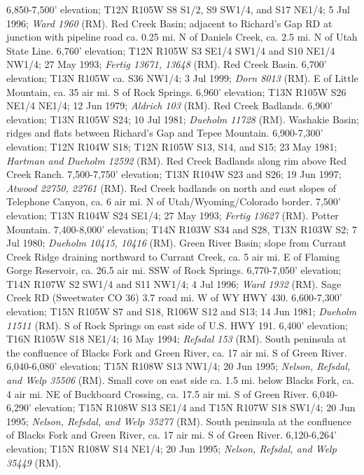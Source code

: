 6,850-7,500' elevation; T12N R105W S8 S1/2, S9 SW1/4, and S17 NE1/4; 5 Jul 1996;
\textit{Ward 1960} (RM).
Red Creek Basin; adjacent to Richard's Gap RD at junction with pipeline road ca.
0.25 mi. N of Daniels Creek, ca. 2.5 mi. N of Utah State Line. 6,760' elevation;
T12N R105W S3 SE1/4 SW1/4 and S10 NE1/4 NW1/4; 27 May 1993;
\textit{Fertig 13671, 13648} (RM).
Red Creek Basin. 6,700' elevation; T13N R105W ca. S36 NW1/4; 3 Jul 1999;
\textit{Dorn 8013} (RM).
E of Little Mountain, ca. 35 air mi. S of Rock Springs. 6,960' elevation;
T13N R105W S26 NE1/4 NE1/4; 12 Jun 1979; \textit{Aldrich 103} (RM).
Red Creek Badlands. 6,900' elevation; T13N R105W S24; 10 Jul 1981;
\textit{Dueholm 11728} (RM).
Washakie Basin; ridges and flats between Richard's Gap and Tepee Mountain.
6,900-7,300' elevation; T12N R104W S18; T12N R105W S13, S14, and S15;
23 May 1981; \textit{Hartman and Dueholm 12592} (RM).
Red Creek Badlands along rim above Red Creek Ranch.	7,500-7,750' elevation;
T13N R104W S23 and S26; 19 Jun 1997; \textit{Atwood 22750, 22761} (RM).
Red Creek badlands on north and east slopes of Telephone Canyon, ca. 6 air mi.
N of Utah/Wyoming/Colorado border. 7,500' elevation; T13N R104W S24 SE1/4;
27 May 1993; \textit{Fertig 13627} (RM).
Potter Mountain. 7,400-8,000' elevation; T14N R103W S34 and S28,
T13N R103W S2; 7 Jul 1980; \textit{Dueholm 10415, 10416} (RM).
Green River Basin; slope from Currant Creek Ridge draining northward to Currant
Creek, ca. 5 air mi. E of Flaming Gorge Reservoir, ca. 26.5 air mi. SSW of Rock
Springs. 6,770-7,050' elevation; T14N R107W S2 SW1/4 and S11 NW1/4; 4 Jul 1996;
\textit{Ward 1932} (RM).
Sage Creek RD (Sweetwater CO 36) 3.7 road mi. W of WY HWY 430.
6,600-7,300' elevation; T15N R105W S7 and S18, R106W S12 and S13; 14 Jun 1981;
\textit{Dueholm 11511} (RM).
S of Rock Springs on east side of U.S. HWY 191. 6,400' elevation;
T16N R105W S18 NE1/4; 16 May 1994; \textit{Refsdal 153} (RM).
South peninsula at the confluence of Blacks Fork and Green River, ca. 17 air mi.
S of Green River. 6,040-6,080' elevation; T15N R108W S13 NW1/4; 20 Jun 1995;
\textit{Nelson, Refsdal, and Welp 35506} (RM).
Small cove on east side ca. 1.5 mi. below Blacks Fork, ca. 4 air mi. NE of
Buckboard Crossing, ca. 17.5 air mi. S of Green River. 6,040-6,290' elevation;
T15N R108W S13 SE1/4 and T15N R107W S18 SW1/4; 20 Jun 1995;
\textit{Nelson, Refsdal, and Welp 35277} (RM).
South peninsula at the confluence of Blacks Fork and Green River, ca. 17 air mi.
S of Green River. 6,120-6,264' elevation; T15N R108W S14 NE1/4; 20 Jun 1995;
\textit{Nelson, Refsdal, and Welp 35449} (RM).
